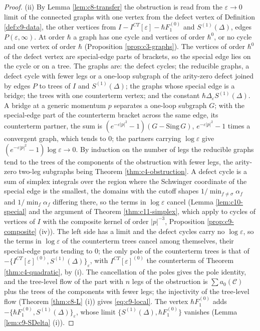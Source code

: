 \begin{proof}
(ii) By Lemma \ref{lem:c8-transfer} the obstruction is read from the $\varepsilon\to0$ limit of the connected graphs with one vertex from the defect vertex of Definition \ref{def:c9-data}, the other vertices from $I-I^{CT}[\varepsilon]-\hbar F_1^{(0)}$ and $S^{(1)}(\Delta)$, edges $P(\varepsilon,\infty)$. At order $\hbar$ a graph has one cycle and vertices of order $\hbar^0$, or no cycle and one vertex of order $\hbar$ (Proposition \ref{prop:c3-graphs}). The vertices of order $\hbar^0$ of the defect vertex are special-edge parts of brackets, so the special edge lies on the cycle or on a tree. The graphs are: the defect cycles; the reducible graphs, a defect cycle with fewer legs or a one-loop subgraph of the arity-zero defect joined by edges $P$ to trees of $I$ and $S^{(1)}(\Delta)$; the graphs whose special edge is a bridge; the trees with one counterterm vertex; and the constant $\hbar\Delta_\varepsilon S^{(1)}(\Delta)$. A bridge at a generic momentum $p$ separates a one-loop subgraph $G$; with the special-edge part of the counterterm bracket across the same edge, its counterterm partner, the sum is $(e^{-\varepsilon|p|^2}-1)(G-\mathrm{Sing}\,G)$, $e^{-\varepsilon|p|^2}-1$ times a convergent graph, which tends to $0$; the partners carrying $\log\varepsilon$ give $(e^{-\varepsilon|p|^2}-1)\log\varepsilon\to0$. By induction on the number of legs the reducible graphs tend to the trees of the components of the obstruction with fewer legs, the arity-zero two-leg subgraphs being Theorem \ref{thm:c4-obstruction}. A defect cycle is a sum of simplex integrals over the region where the Schwinger coordinate of the special edge is the smallest, the domains with the cutoff shapes $1/\min_{f\ne\sigma}\alpha_f$ and $1/\min_f\alpha_f$ differing there, so the terms in $\log\varepsilon$ cancel (Lemma \ref{lem:c10-special} and the argument of Theorem \ref{thm:c11-simplex}, which apply to cycles of vertices of $I$ with the composite kernel of order $|p|^{-3}$, Proposition \ref{prop:c9-composite} (iv)). The left side has a limit and the defect cycles carry no $\log\varepsilon$, so the terms in $\log\varepsilon$ of the counterterm trees cancel among themselves, their special-edge parts tending to $0$; the only pole of the counterterm trees is that of $-\{I^{CT}[\varepsilon]^{(0)},S^{(1)}(\Delta)\}_\varepsilon$, with $I^{CT}[\varepsilon]^{(0)}$ the counterterm of Theorem \ref{thm:c4-quadratic}, by (i). The cancellation of the poles gives the pole identity, and the tree-level flow of the part with $n$ legs of the obstruction is $\sum a_0(\mathcal C)$ plus the trees of the components with fewer legs; the injectivity of the tree-level flow (Theorem \ref{thm:c8-L} (i)) gives \eqref{eq:c9-local}. The vertex $\hbar F_1^{(0)}$ adds $-\{\hbar F_1^{(0)},S^{(1)}(\Delta)\}_\varepsilon$, whose limit $\{S^{(1)}(\Delta),\hbar F_1^{(0)}\}$ vanishes (Lemma \ref{lem:c9-SDelta} (i)).


\end{proof}
